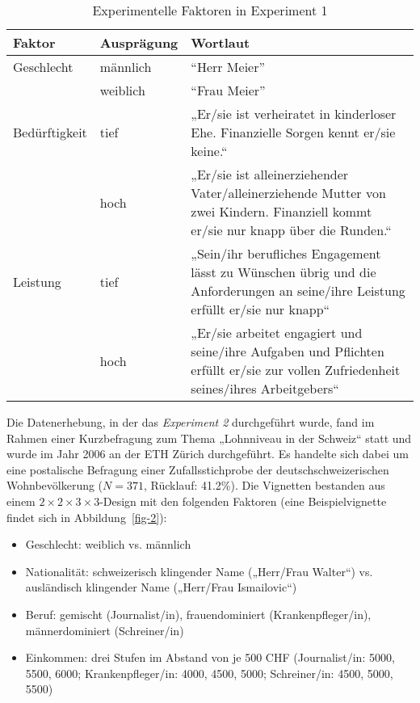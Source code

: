 \documentclass[a4paper,12pt]{article}
\renewcommand{\baselinestretch}{1.1}
\newif\ifcomments
\newcommand{\comment}[1]{%
    \ifcomments\marginpar{\renewcommand{\baselinestretch}{1}\tiny\hspace*{-1.1em}\colorbox{gray!20}%
    {\textcolor{red}{\parbox[t]{.9in}{\raggedright #1}}}}\fi}
\begin{document}
\begin{table}
    \small
    \caption{Experimentelle Faktoren in Experiment 1}\label{tab-ex1-faktoren}
    \begin{tabularx}{\textwidth}{@{}llX@{}}
        \toprule
        Faktor          & Ausprägung & Wortlaut       \\\midrule
        Geschlecht      & männlich     & “Herr Meier”   \\
                        & weiblich     & “Frau Meier”   \\
        \addlinespace
        Bedürftigkeit   & tief         & „Er/sie ist verheiratet in kinderloser Ehe. Finanzielle Sorgen kennt er/sie keine.“ \\
                        & hoch         & „Er/sie ist alleinerziehender Vater/alleinerziehende Mutter von zwei Kindern. Finanziell kommt er/sie nur knapp über die Runden.“ \\
        \addlinespace
        Leistung        & tief         & „Sein/ihr berufliches Engagement lässt zu Wünschen übrig und die Anforderungen an seine/ihre Leistung erfüllt er/sie nur knapp“   \\
                        & hoch         & „Er/sie arbeitet engagiert und seine/ihre Aufgaben und Pflichten erfüllt er/sie zur vollen Zufriedenheit seines/ihres Arbeitgebers“  \\
        \bottomrule
    \end{tabularx}
\end{table}

Die Datenerhebung, in der das \emph{Experiment 2} durchgeführt wurde, fand im Rahmen einer Kurzbefragung zum
Thema „Lohnniveau in der Schweiz“ statt und wurde im Jahr 2006 an der ETH
Zürich durchgeführt. Es handelte sich dabei um eine postalische Befragung einer
Zufallsstichprobe der deutschschweizerischen Wohnbevölkerung ($N = 371$,
Rücklauf: 41.2\%). Die Vignetten bestanden aus einem $2 \times 2 \times 3 \times
3$-Design mit den folgenden Faktoren (eine Beispielvignette findet sich in
Abbildung~\ref{fig-2}): \comment{Tabelle zu Faktoren wie bei Experiment 1}
\begin{itemize}
\item Geschlecht: weiblich vs. männlich
\item Nationalität: schweizerisch klingender Name („Herr/Frau Walter“) vs. ausländisch klingender Name („Herr/Frau Ismailovic“)
\item Beruf: gemischt (Journalist/in), frauendominiert (Krankenpfleger/in), männerdominiert (Schreiner/in)
\item Einkommen: drei Stufen im Abstand von je 500 CHF (Journalist/in: 5000, 5500, 6000; Krankenpfleger/in: 4000, 4500, 5000; 
Schreiner/in: 4500, 5000, 5500)
\end{itemize}
\end{document}
